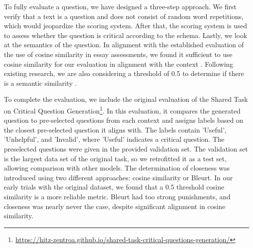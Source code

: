 \documentclass[11pt]{article}
\begin{document}
To fully evaluate a question, we have designed a three-step approach. We first verify that a text is a question and does not consist of random word repetitions, which would jeopardize the scoring system. After that, the scoring system is used to assess whether the question is critical according to the schema. Lastly, we look at the semantics of the question. In alignment with the established evaluation of the use of cosine similarity in essay assessments, we found it sufficient to use cosine similarity for our evaluation in alignment with the context \cite{lahitani2016cosine}. Following existing research, we are also considering a threshold of 0.5 to determine if there is a semantic similarity \cite{koudas2004flexible}.

To complete the evaluation, we include the original evaluation of the Shared Task on Critical Question Generation\footnote{\url{https://hitz-zentroa.github.io/shared-task-critical-questions-generation/}}. In this evaluation, it compares the generated question to pre-selected questions from each context and assigns labels based on the closest pre-selected question it aligns with. The labels contain 'Useful', 'Unhelpful', and 'Invalid', where 'Useful' indicates a critical question. The preselected questions were given in the provided validation set. The validation set is the largest data set of the original task, so we retrofitted it as a test set, allowing comparison with other models. The determination of closeness was introduced using two different approaches: cosine similarity or Bleurt. In our early trials with the original dataset, we found that a 0.5 threshold cosine similarity is a more reliable metric. Bleurt had too strong punishments, and closeness was nearly never the case, despite significant alignment in cosine similarity.
\end{document}
